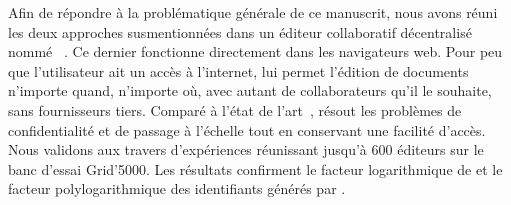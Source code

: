 Afin de répondre à la problématique générale de ce manuscrit, nous avons réuni
les deux approches susmentionnées dans un éditeur collaboratif décentralisé
nommé \CRATE~\cite{nedelec2016crate}. Ce dernier fonctionne directement dans les
navigateurs web. Pour peu que l'utilisateur ait un accès à l'internet, \CRATE
lui permet l'édition de documents n'importe quand, n'importe où, avec autant de
collaborateurs qu'il le souhaite, sans fournisseurs tiers. Comparé à l'état de
l'art~\cite{etherpad, googledocs, hivejs, lautamaki2012cored,
  nicolaescu2015yjs}, \CRATE résout les problèmes de confidentialité et de
passage à l'échelle tout en conservant une facilité d'accès. Nous validons
\CRATE aux travers d'expériences réunissant jusqu'à 600 éditeurs sur le banc
d'essai Grid'5000. Les résultats confirment le facteur logarithmique de \SPRAY
et le facteur polylogarithmique des identifiants générés par \LSEQ.



